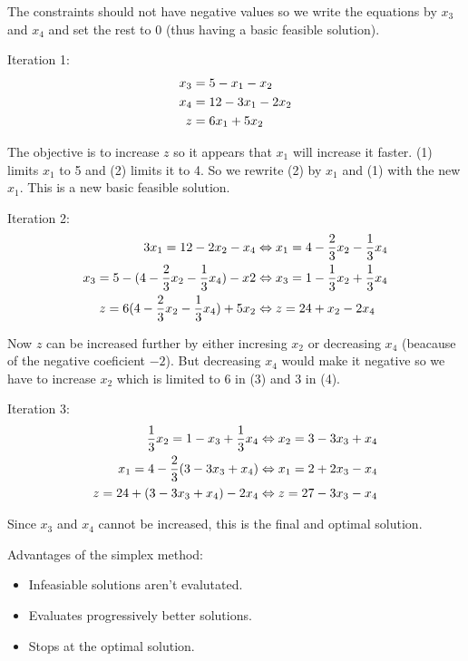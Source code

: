 \documentclass[a4paper, 12pt]{article}
\begin{document}
The constraints should not have negative values so we write the equations by
$x_3$ and $x_4$ and set the rest to 0 (thus having a basic feasible solution).

Iteration 1:
\setcounter{equation}{0}
\begin{align}
    x_3 &= 5 - x_1 - x_2 \\
    x_4 &= 12 - 3x_1 - 2x_2 \\
    z &= 6x_1 + 5x_2 \notag
\end{align}

The objective is to increase $z$ so it appears that $x_1$ will increase it
faster. (1) limits $x_1$ to 5 and (2) limits it to 4. So we rewrite (2) by
$x_1$ and (1) with the new $x_1$. This is a new basic feasible solution.

Iteration 2:
\begin{align}
    3x_1 = 12 - 2x_2 - x_4 &\Leftrightarrow
        x_1 = 4 - \frac{2}{3}x_2 - \frac{1}{3}x_4 \\
    x_3 = 5 - (4 - \frac{2}{3}x_2 - \frac{1}{3}x_4) - x2 &\Leftrightarrow
        x_3 = 1 - \frac{1}{3}x_2 + \frac{1}{3}x_4 \\
    z = 6 (4 - \frac{2}{3}x_2 - \frac{1}{3}x_4) + 5x_2 &\Leftrightarrow
        z = 24 + x_2 - 2x_4 \notag
\end{align}

Now $z$ can be increased further by either incresing $x_2$ or decreasing $x_4$
(beacause of the negative coeficient $-2$). But decreasing $x_4$ would make it
negative so we have to increase $x_2$ which is limited to 6 in (3) and 3 in (4).

Iteration 3:
\begin{align}
    \frac{1}{3}x_2 = 1 - x_3 + \frac{1}{3}x_4 &\Leftrightarrow
        x_2 = 3 - 3x_3 + x_4 \\
    x_1 = 4 - \frac{2}{3}(3 - 3x_3 + x_4) &\Leftrightarrow
        x_1 = 2 + 2x_3 - x_4 \\
    z = 24 + (3 - 3x_3 + x_4) - 2x_4 &\Leftrightarrow
        z = 27 - 3x_3 - x_4 \notag
\end{align}

Since $x_3$ and $x_4$ cannot be increased, this is the final and optimal
solution.

Advantages of the simplex method:

\begin{itemize}
    \item Infeasiable solutions aren't evalutated.
    \item Evaluates progressively better solutions.
    \item Stops at the optimal solution.
\end{itemize}
\end{document}
